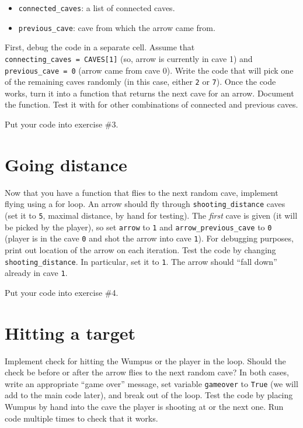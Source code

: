 \documentclass[
]{book}
\providecommand{\tightlist}{%
  \setlength{\itemsep}{0pt}\setlength{\parskip}{0pt}}
\begin{document}
\begin{itemize}
\tightlist
\item
  \texttt{connected\_caves}: a list of connected caves.
\item
  \texttt{previous\_cave}: cave from which the arrow came from.
\end{itemize}

First, debug the code in a separate cell. Assume that \texttt{connecting\_caves\ =\ CAVES{[}1{]}} (so, arrow is currently in cave 1) and \texttt{previous\_cave\ =\ 0} (arrow came from cave 0). Write the code that will pick one of the remaining caves randomly (in this case, either \texttt{2} or \texttt{7}). Once the code works, turn it into a function that returns the next cave for an arrow. Document the function. Test it with for other combinations of connected and previous caves.

Put your code into exercise \#3.

\hypertarget{going-distance}{%
\section{Going distance}\label{going-distance}}

Now that you have a function that flies to the next random cave, implement flying using a for loop. An arrow should fly through \texttt{shooting\_distance} caves (set it to \texttt{5}, maximal distance, by hand for testing). The \emph{first} cave is given (it will be picked by the player), so set \texttt{arrow} to \texttt{1} and \texttt{arrow\_previous\_cave} to \texttt{0} (player is in the cave \texttt{0} and shot the arrow into cave \texttt{1}). For debugging purposes, print out location of the arrow on each iteration. Test the code by changing \texttt{shooting\_distance}. In particular, set it to \texttt{1}. The arrow should ``fall down'' already in cave \texttt{1}.

Put your code into exercise \#4.

\hypertarget{hitting-a-target}{%
\section{Hitting a target}\label{hitting-a-target}}

Implement check for hitting the Wumpus or the player in the loop. Should the check be before or after the arrow flies to the next random cave? In both cases, write an appropriate ``game over'' message, set variable \texttt{gameover} to \texttt{True} (we will add to the main code later), and break out of the loop. Test the code by placing Wumpus by hand into the cave the player is shooting at or the next one. Run code multiple times to check that it works.
\end{document}

